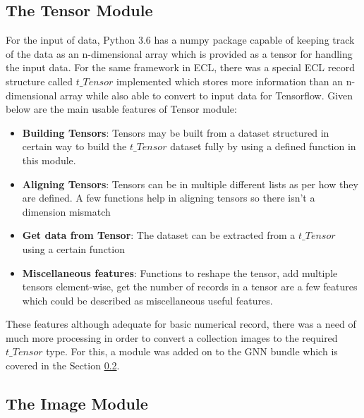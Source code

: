 \documentclass[conference]{IEEEtran}
\begin{document}
\subsection{The Tensor Module}

For the input of data, Python 3.6 has a numpy package capable of keeping track of the data as an n-dimensional array which is provided as a tensor for handling the input data. For the same framework in ECL, there was a special ECL record structure called $t\_Tensor$ implemented which stores more information than an n-dimensional array while also able to convert to input data for Tensorflow. Given below are the main usable features of Tensor module:

\begin{itemize}
    \item \textbf{Building Tensors}: Tensors may be built from a dataset structured in certain way to build the $t\_Tensor$ dataset fully by using a defined function in this module.
    \item \textbf{Aligning Tensors}: Tensors can be in multiple different lists as per how they are defined. A few functions help in aligning tensors so there isn't a dimension mismatch
    \item \textbf{Get data from Tensor}: The dataset can be extracted from a $t\_Tensor$ using a certain function
    \item \textbf{Miscellaneous features}: Functions to reshape the tensor, add multiple tensors element-wise, get the number of records in a tensor are a few features which could be described as miscellaneous useful features.
\end{itemize}

These features although adequate for basic numerical record, there was a need of much more processing in order to convert a collection images to the required $t\_Tensor$ type. For this, a module was added on to the GNN bundle which is covered in the Section \ref{imagemod}.

\subsection{The Image Module}\label{imagemod}
\end{document}

